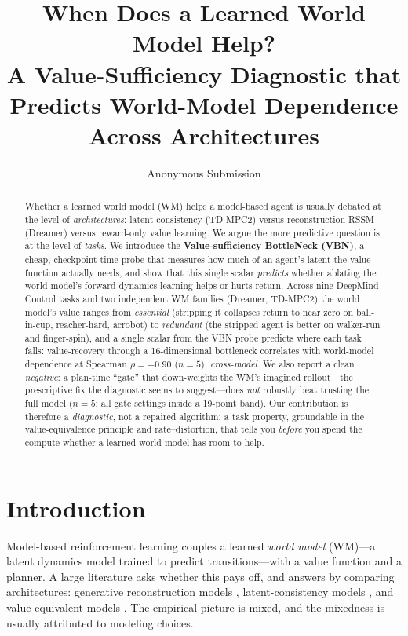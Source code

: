 \documentclass[letterpaper]{article}
\title{When Does a Learned World Model Help?\\
A Value-Sufficiency Diagnostic that Predicts World-Model Dependence Across Architectures}
\author{Anonymous Submission}
\begin{document}
\maketitle

\begin{abstract}
Whether a learned world model (WM) helps a model-based agent is usually
debated at the level of \emph{architectures}: latent-consistency (TD-MPC2)
versus reconstruction RSSM (Dreamer) versus reward-only value learning.
We argue the more predictive question is at the level of \emph{tasks}.
We introduce the \textbf{Value-sufficiency BottleNeck (VBN)}, a cheap,
checkpoint-time probe that measures how much of an agent's latent the value
function actually needs, and show that this single scalar \emph{predicts}
whether ablating the world model's forward-dynamics learning helps or hurts
return. Across nine DeepMind Control tasks and two independent WM families
(Dreamer, TD-MPC2) the world model's value ranges from \emph{essential}
(stripping it collapses return to near zero on ball-in-cup,
reacher-hard, acrobot) to \emph{redundant} (the stripped agent is better on
walker-run and finger-spin), and a single scalar from the VBN probe predicts
where each task falls: value-recovery through a 16-dimensional bottleneck
correlates with world-model dependence at Spearman $\rho{=}{-}0.90$
($n{=}5$), \emph{cross-model}. We also report a clean \emph{negative}:
a plan-time ``gate'' that down-weights the WM's imagined rollout---the
prescriptive fix the diagnostic seems to suggest---does \emph{not} robustly
beat trusting the full model ($n{=}5$; all gate settings inside a 19-point
band). Our contribution is therefore a \emph{diagnostic}, not a repaired
algorithm: a task property, groundable in the value-equivalence principle
and rate--distortion, that tells you \emph{before} you spend the compute
whether a learned world model has room to help.
\end{abstract}

\section{Introduction}
Model-based reinforcement learning couples a learned \emph{world model}
(WM)---a latent dynamics model trained to predict transitions---with a value
function and a planner. A large literature asks whether this pays off, and
answers by comparing architectures: generative reconstruction models
\cite{hafner2023dreamerv3}, latent-consistency models
\cite{hansen2024tdmpc2}, and value-equivalent models
\cite{schrittwieser2020muzero,grimm2020value}. The empirical picture is
mixed, and the mixedness is usually attributed to modeling choices.
\end{document}
